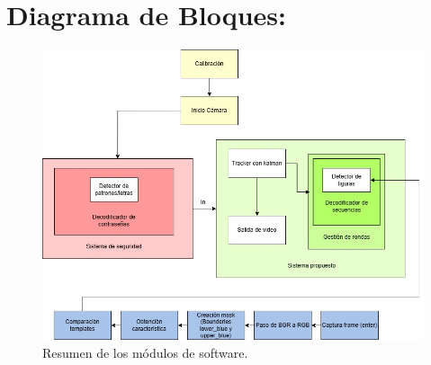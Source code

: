 \section{Diagrama de Bloques:}

\begin{figure}[H]
    \centering
    \includegraphics[width=\textwidth -2cm]{CAPS/CAP7.jpg}
    \caption{Resumen de los módulos de software.}
    \label{fig:imagenes}
\end{figure}
